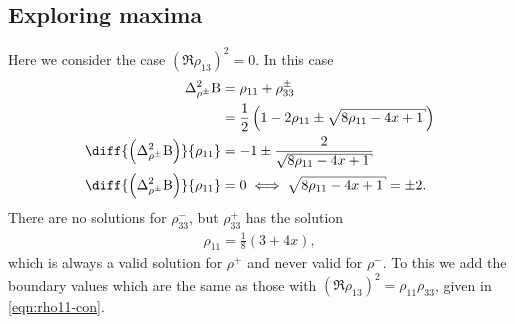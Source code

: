 \subsection{Exploring maxima}
Here we consider the case $\left(\Re{\rho_{13}}\right)^2 = 0$. In this case
\begin{align}
  \var[\rho^\pm]{\opb} &= \rho_{11} + \rho_{33}^\pm\\
                       &= \frac{1}{2} \left(1-2 \rho_{11}\pm\sqrt{8 \rho_{11}-4 x+1}\right)\\
  \diff{\left(\var[\rho^\pm]{\opb}\right)}{\rho_{11}} &= -1 \pm \frac{2}{\sqrt{8\rho_{11} -4x+1}}\\
  \diff{\left(\var[\rho^\pm]{\opb}\right)}{\rho_{11}} &= 0 \iff \sqrt{8\rho_{11} -4x+1} = \pm 2.
                                                        \label{eqn:deriv-y-rhomax-is-zero}
\end{align}
There are no solutions for $\rho_{33}^-$, but $\rho_{33}^+$ has the solution
\begin{align}
  \label{eqn:rho-plus-max-zero-deriv-solns}
  \rho_{11} = \frac{1}{8}\left(3+4x\right),
\end{align}
which is always a valid solution for $\rho^+$ and never valid for $\rho^-$. To this we add the boundary values which are the same as those with $\left(\Re{\rho_{13}}\right)^2 = \rho_{11}\rho_{33}$, given in \eqref{eqn:rho11-con}.

